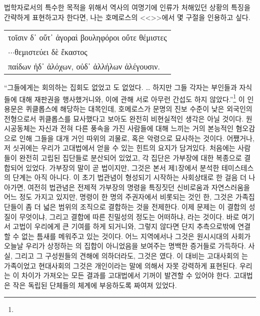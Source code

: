 법학자로서의 특수한 목적을 위해서
역사의 여명기에 인류가 처해있던 상황의 특징을 간략하게 표현하고자 한다면,
나는 \hypertarget{cyclops}{호메로스}의 <<>>에서 몇 구절을 인용하고 싶다.
\begin{center}
  \greekfont\latinmarks
  \begin{tabular}{l}
    τοῖσιν δ᾽ οὔτ᾽ ἀγοραὶ βουληφόροι οὔτε θέμιστες\rlap{.}\\
    \hfill$\cdot$\hfill$\cdot$\hfill$\cdot$\hfill θεμιστεύει δὲ ἕκαστος\\
    παίδων ἠδ᾽ ἀλόχων, οὐδ᾽ ἀλλήλων ἀλέγουσιν.
  \end{tabular}
\end{center}
``그들에게는 회의하는 집회도 없었고 도 없었다. \ldots{}
하지만 그들 각자는 부인들과 자식들에 대해 재판권을 행사했거니와,
이에 관해 서로 아무런 간섭도 하지 않았다.''\footnote{}
이 인용문은 퀴클롭스에 해당하는 대목인데,
호메로스가
문명의 진보 수준이 낮은 외국인의 전형으로서
퀴클롭스를
묘사했다고 보아도 완전히 비현실적인 생각은 아닐 것이다.
원시공동체는 자신과 전혀 다른 풍속을 가진 사람들에 대해 느끼는
거의 본능적인 혐오감으로 인해 그들을 대개 거인 따위의 괴물로,
혹은  악령으로
묘사하는 것이다.
어쨌거나, 저 싯귀에는 우리가 고대법에서 얻을 수 있는 힌트의 요지가 담겨있다.
처음에는 사람들이 완전히 고립된 집단들로 분산되어 있었고,
각 집단은 가부장에 대한 복종으로 결합되어 있었다.
가부장의 말이 곧 법이지만, 그것은 본서 제1장에서 분석한
테미스테스의 단계는 아직 아니다.
이 초기 법관념이 형성되기 시작하는 사회상태로 한 걸음 더 나아가면,
여전히
법관념은 전제적 가부장의 명령을 특징짓던 신비로움과 자연스러움을
어느 정도 가지고 있지만,
명령이 한 명의 주권자에서 비롯되는 것인 한,
그것은 가족집단들이 좀 더 넓은 범위의 조직으로 결합하는 것을
전제한다.
이제 문제는 이 결합의 성질이 무엇이냐, 그리고
결합에 따른 친밀성의 정도는 어떠하냐, 라는 것이다.
바로 여기서 고법이 우리에게 큰 기여를 하게 되거니와,
그렇지 않다면 단지 추측으로밖에 연결할 수 없는 틈새를 메워주고 있는 것이다.
어느 지역에서나 그것은 원시시대의 사회가 오늘날 우리가 상정하는
의 집합이 아니었음을 보여주는 명백한 증거들로 가득하다.
사실, 그리고 그 구성원들의 견해에 의하더라도,
그것은 였다.
이 대비는
고대사회의 는 가족이었고
현대사회의 그것은 개인이라는 말에 의해서
자못 강력하게 표현된다.
우리는 이 차이가 가져오는 모든 결과를 고대법에서 기꺼이 발견할 수 있어야 한다.
고대법은 작은 독립된 단체들의 체계에 부응하도록 짜여져 있었다.
